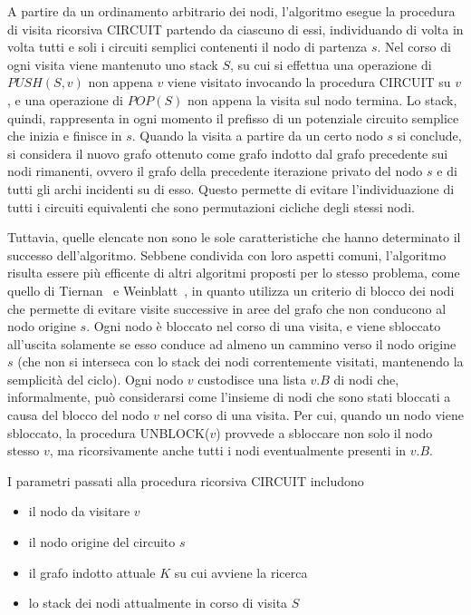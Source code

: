 A partire da un ordinamento arbitrario dei nodi, l'algoritmo esegue la procedura di visita ricorsiva CIRCUIT partendo
da ciascuno di essi, individuando di volta in volta tutti e soli i circuiti semplici contenenti il nodo di partenza $s$.
Nel corso di ogni visita viene mantenuto uno stack $S$, su cui si effettua una operazione di $PUSH(S, v)$ non
appena $v$ viene visitato invocando la procedura CIRCUIT su $v$, e una operazione di $POP(S)$ non appena la visita
sul nodo termina.
Lo stack, quindi, rappresenta in ogni momento il prefisso di un potenziale circuito semplice che inizia e finisce in $s$.
Quando la visita a partire da un certo nodo $s$ si conclude, si considera il nuovo grafo ottenuto come grafo indotto
dal grafo precedente sui nodi rimanenti, ovvero il grafo della precedente iterazione privato del nodo $s$ e di tutti
gli archi incidenti su di esso.
Questo permette di evitare l'individuazione di tutti i circuiti equivalenti che sono permutazioni cicliche degli stessi
nodi. \newline

Tuttavia, quelle elencate non sono le sole caratteristiche che hanno determinato il successo dell'algoritmo.
Sebbene condivida con loro aspetti comuni, l'algoritmo risulta essere pi\`u efficente di altri algoritmi
proposti per lo stesso problema, come quello di Tiernan~\cite{10.1145/362814.362819} e
Weinblatt~\cite{10.1145/321679.321684}, in quanto utilizza un criterio di blocco
dei nodi che permette di evitare visite successive in aree del grafo che non conducono al nodo origine $s$.
Ogni nodo \`e bloccato nel corso di una visita, e viene sbloccato all'uscita solamente se esso conduce ad almeno
un cammino verso il nodo origine $s$ (che non si interseca con lo stack dei nodi correntemente visitati, mantenendo
la semplicit\`a del ciclo).
Ogni nodo $v$ custodisce una lista $v.B$ di nodi che, informalmente, pu\`o considerarsi come l'insieme di nodi
che sono stati bloccati a causa del blocco del nodo $v$ nel corso di una visita.
Per cui, quando un nodo viene sbloccato, la procedura UNBLOCK($v$) provvede a sbloccare non solo il nodo stesso $v$,
ma ricorsivamente anche tutti i nodi eventualmente presenti in $v.B$.



\newpage

I parametri passati alla procedura ricorsiva CIRCUIT includono
\begin{itemize}
    \item il nodo da visitare $v$
    \item il nodo origine del circuito $s$
    \item il grafo indotto attuale $K$ su cui avviene la ricerca
    \item lo stack dei nodi attualmente in corso di visita $S$
\end{itemize}

